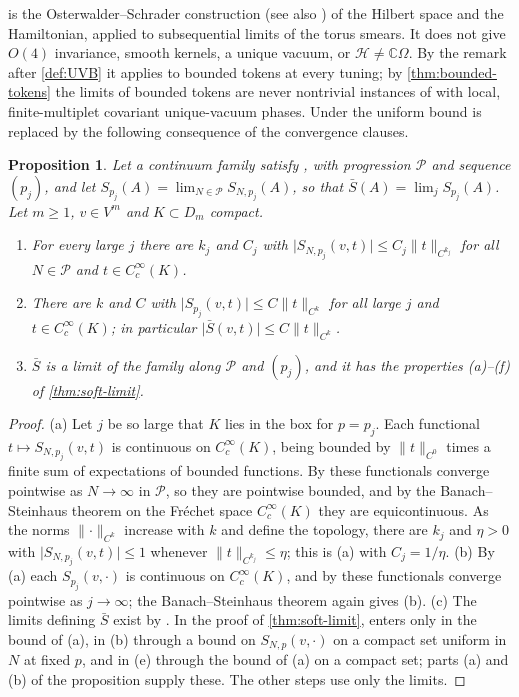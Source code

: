 \documentclass[11pt,a4paper]{amsart}
\newtheorem{proposition}[theorem]{Proposition}
\theoremstyle{definition}
\theoremstyle{remark}
\numberwithin{equation}{section}
\newcommand{\C}{\mathbb{C}}          %
\newcommand{\Hilb}{\mathcal{H}}      %
\newcommand{\norm}[1]{\lVert #1\rVert}     %
\newcommand{\abs}[1]{\lvert #1\rvert}      %
\newcommand{\hypW}{\text{\upshape(W)}}              %
\newcommand{\UVB}{\text{\upshape(UVB)}}             %
\begin{document}
 is the Osterwalder--Schrader construction \cite{osterwalder1973} (see also \cite{glimm1987}) of the Hilbert space and the Hamiltonian, applied to subsequential limits of the torus smears. It does not give $O(4)$ invariance, smooth kernels, a unique vacuum, or $\Hilb\ne\C\Omega$. By the remark after \cref{def:UVB} it applies to bounded tokens at every tuning; by \cref{thm:bounded-tokens} the limits of bounded tokens are never nontrivial instances of \hypW{} with local, finite-multiplet covariant unique-vacuum phases. Under \hypW{} the uniform bound \UVB{} is replaced by the following consequence of the convergence clauses.

\begin{proposition}\label{prop:W-implies-UVB}
Let a continuum family satisfy \hypW, with progression $\mathcal P$ and sequence $(p_j)$, and let $S_{p_j}(A)=\lim_{N\in\mathcal P}S_{N,p_j}(A)$, so that $\bar S(A)=\lim_jS_{p_j}(A)$. Let $m\ge1$, $v\in V^m$ and $K\subset D_m$ compact.
\begin{enumerate}[label=(\alph*),leftmargin=2.2em]
\item For every large $j$ there are $k_j$ and $C_j$ with $\abs{S_{N,p_j}(v,t)}\le C_j\norm{t}_{C^{k_j}}$ for all $N\in\mathcal P$ and $t\in C^\infty_c(K)$.
\item There are $k$ and $C$ with $\abs{S_{p_j}(v,t)}\le C\norm{t}_{C^k}$ for all large $j$ and $t\in C^\infty_c(K)$; in particular $\abs{\bar S(v,t)}\le C\norm{t}_{C^k}$.
\item $\bar S$ is a limit of the family along $\mathcal P$ and $(p_j)$, and it has the properties (a)--(f) of \cref{thm:soft-limit}.
\end{enumerate}
\end{proposition}

\begin{proof}
(a) Let $j$ be so large that $K$ lies in the box for $p=p_j$. Each functional $t\mapsto S_{N,p_j}(v,t)$ is continuous on $C^\infty_c(K)$, being bounded by $\norm{t}_{C^0}$ times a finite sum of expectations of bounded functions. By \hypW{} these functionals converge pointwise as $N\to\infty$ in $\mathcal P$, so they are pointwise bounded, and by the Banach--Steinhaus theorem on the Fr\'echet space $C^\infty_c(K)$ they are equicontinuous. As the norms $\norm{\cdot}_{C^k}$ increase with $k$ and define the topology, there are $k_j$ and $\eta>0$ with $\abs{S_{N,p_j}(v,t)}\le1$ whenever $\norm{t}_{C^{k_j}}\le\eta$; this is (a) with $C_j=1/\eta$. (b) By (a) each $S_{p_j}(v,\cdot)$ is continuous on $C^\infty_c(K)$, and by \hypW{} these functionals converge pointwise as $j\to\infty$; the Banach--Steinhaus theorem again gives (b). (c) The limits defining $\bar S$ exist by \hypW. In the proof of \cref{thm:soft-limit}, \UVB{} enters only in the bound of (a), in (b) through a bound on $S_{N,p}(v,\cdot)$ on a compact set uniform in $N$ at fixed $p$, and in (e) through the bound of (a) on a compact set; parts (a) and (b) of the proposition supply these. The other steps use only the limits.
\end{proof}
\end{document}
